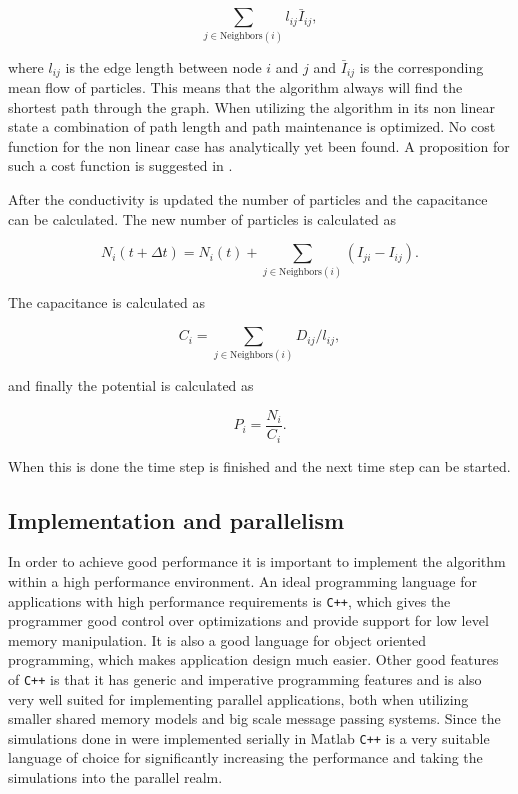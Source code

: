 \begin{equation}
\sum_{j \in \text{Neighbors}(i)} l_{ij} \bar{I}_{ij},
\end{equation}

 \noindent where $l_{ij}$ is the edge length between node $i$ and $j$ and $\bar{I}_{ij}$ is the corresponding mean flow of particles. This means that the algorithm always will find the shortest path through the graph. When utilizing the algorithm in its non linear state a combination of path length and path maintenance is optimized. No cost function for the non linear case has analytically yet been found. A proposition for such a cost function is suggested in \cite{Sumpter}. 

After the conductivity is updated the number of particles and the capacitance can be calculated. The new number of particles is calculated as

 \begin{equation}
 N_i(t + \Delta t) = N_i(t) + \sum_{j \in \text{Neighbors}(i)} \left( I_{ji} - I_{ij} \right).
 \end{equation}

 \noindent The capacitance is calculated as 

 \begin{equation}
 C_i = \sum_{j \in \text{Neighbors}(i)} D_{ij}/l_{ij},
 \end{equation}
 
 \noindent and finally the potential is calculated as
 
 \begin{equation}
 P_i = \frac{N_i}{C_i}.
 \end{equation}
 
 \noindent When this is done the time step is finished and the next time step can be started.

\subsection{Implementation and parallelism} 
\label{sec:parallel}
In order to achieve good performance it is important to implement the algorithm within a high performance environment. An ideal programming language for applications with high performance requirements is \texttt{C++}, which gives the programmer good control over optimizations and provide support for low level memory manipulation. It is also a good language for object oriented programming, which makes application design much easier. Other good features of \texttt{C++} is that it has generic and imperative programming features and is also very well suited for implementing parallel applications, both when utilizing smaller shared memory models and big scale message passing systems. Since the simulations done in \cite{Sumpter} were implemented serially in Matlab \texttt{C++} is a very suitable language of choice for significantly increasing the performance and taking the simulations into the parallel realm.


